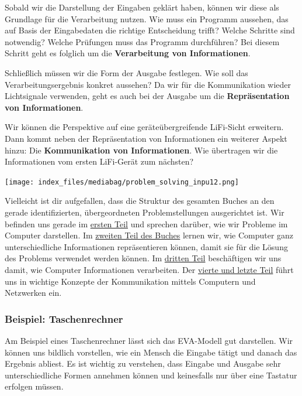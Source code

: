 \documentclass[
  letterpaper,
  DIV=11]{scrreprt}
\begin{document}
Sobald wir die Darstellung der Eingaben geklärt haben, können wir diese
als Grundlage für die Verarbeitung nutzen. Wie muss ein Programm
aussehen, das auf Basis der Eingabedaten die richtige Entscheidung
trifft? Welche Schritte sind notwendig? Welche Prüfungen muss das
Programm durchführen? Bei diesem Schritt geht es folglich um die
\textbf{Verarbeitung von Informationen}.

Schließlich müssen wir die Form der Ausgabe festlegen. Wie soll das
Verarbeitungsergebnis konkret aussehen? Da wir für die Kommunikation
wieder Lichtsignale verwenden, geht es auch bei der Ausgabe um die
\textbf{Repräsentation von Informationen}.

Wir können die Perspektive auf eine geräteübergreifende LiFi-Sicht
erweitern. Dann kommt neben der Repräsentation von Informationen ein
weiterer Aspekt hinzu: Die \textbf{Kommunikation von Informationen}. Wie
übertragen wir die Informationen vom ersten LiFi-Gerät zum nächsten?

\begin{center}
\texttt{[image: index\_files/mediabag/problem\_solving\_inpu12.png]}
\end{center}

Vielleicht ist dir aufgefallen, dass die Struktur des gesamten Buches an
den gerade identifizierten, übergeordneten Problemstellungen
ausgerichtet ist. Wir befinden uns gerade im
\href{part-problems.qmd}{ersten Teil} und sprechen darüber, wie wir
Probleme im Computer darstellen. Im
\href{part-representation.qmd}{zweiten Teil des Buches} lernen wir, wie
Computer ganz unterschiedliche Informationen repräsentieren können,
damit sie für die Lösung des Problems verwendet werden können. Im
\href{part-processing.qmd}{dritten Teil} beschäftigen wir uns damit, wie
Computer Informationen verarbeiten. Der
\href{part-communication.qmd}{vierte und letzte Teil} führt uns in
wichtige Konzepte der Kommunikation mittels Computern und Netzwerken
ein.

\subsubsection{Beispiel: Taschenrechner}\label{beispiel-taschenrechner}

Am Beispiel eines Taschenrechner lässt sich das EVA-Modell gut
darstellen. Wir können uns bildlich vorstellen, wie ein Mensch die
Eingabe tätigt und danach das Ergebnis abliest. Es ist wichtig zu
verstehen, dass Eingabe und Ausgabe sehr unterschiedliche Formen
annehmen können und keinesfalls nur über eine Tastatur erfolgen müssen.
\end{document}
